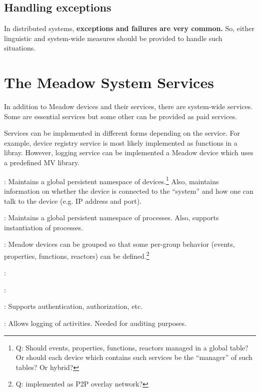 \documentclass{note}
\begin{document}
{\subsection{Handling exceptions}
In distributed systems, \textcolor{blue2}{\bf exceptions and failures are very
  common.} So, either linguistic and system-wide measures should be provided
to handle such situations. 


\section{The Meadow System Services}
In addition to Meadow devices and their services, there are 
system-wide services. Some are essential services but some other can be
provided as paid services.

Services can be implemented in different forms depending on the service.
For example, device registry service  is most likely implemented as functions
in a libray. However, logging service can be implemented a Meadow device which
uses a predefined MV library.


\bit
\w \textcolor{blue2}{}: 
   Maintains a global persistent namespace of devices.\footnote{\textcolor{green2}{Q: Should events, properties, functions, reactors
     managed in a global table? Or should each device which contains such
     services be the ``manager'' of such tables? Or hybrid?}}
   Also, maintains information on whether the device is connected to the
   ``system'' and how one can talk to the device (e.g. IP address and port).

\w \textcolor{blue2}{}:
   Maintains a global persistent namespace of processes. 
   Also, supports instantiation of processes.

\w \textcolor{blue2}{}:
   Meadow devices can be grouped so that some per-group behavior (events,
   properties, functions, reactors) can be defined.\footnote{\textcolor{green2}{Q: implemented as P2P overlay network?}}

\w \textcolor{blue2}{}:

\w \textcolor{blue2}{}:

\w \textcolor{blue2}{}:
  Supports authentication, authorization, etc.

\w \textcolor{blue2}{}:
  Allows logging of activities. Needed for auditing purposes.

}
\end{document}
